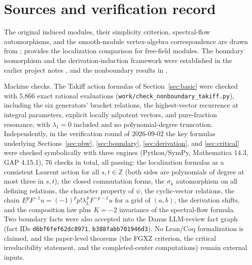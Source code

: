 \documentclass[11pt,a4paper]{article}
\newcommand{\Z}{\mathbb Z}
\theoremstyle{plainupright}
\begin{document}
\section{Sources and verification record}\label{sec:verify}

The original induced modules, their simplicity criterion, spectral-flow
automorphisms, and the smooth-module vertex-algebra correspondence are drawn
from \cite{FGXZ}; \cite{FGM} provides the localization comparison for
free-field modules. The boundary isomorphism and the derivation-induction
framework were established in the earlier project notes \cite{Boundary,
LivingV8}, and the nonboundary results in \cite{Nonboundary}.

Machine checks. The Takiff action formulas of Section~\ref{sec:basic} were
checked with 5,866 exact rational evaluations
(\texttt{work/check\_nonboundary\_takiff.py}), including the six generators'
bracket relations, the highest-vector recurrence at integral parameters,
explicit locally nilpotent vectors, and pure-fraction resonance, with
\(\lambda_1=0\) included and no polynomial-degree truncation. Independently,
in the verification round of 2026-09-02 the key formulas underlying
Sections~\ref{sec:pbw}, \ref{sec:boundary}, \ref{sec:derivation}, and
\ref{sec:critical} were checked symbolically with three engines
(Python/SymPy, Mathematica 14.3, GAP 4.15.1), 76 checks in total, all
passing: the localization formulas as a consistent Laurent action for all
\(s,t\in\Z\) (both sides are polynomials of degree at most three in \(s,t\)),
the closed commutation forms, the \(\sigma_k\) automorphism on all defining
relations, the character property of \(\psi\), the cyclic-vector relations,
the chain \(E^pF^{-1}u=(-1)^pp!\lambda_L^{\,p}F^{-p-1}u\) for a grid of
\((a,b)\), the derivation shifts, and the composition law plus \(K=-2\)
invariance of the spectral-flow formula. Two boundary facts were also
accepted into the Danus LLM-review fact graph (fact IDs
\texttt{d6bf6fef62dc8971}, \texttt{b388fabb701946d3}). No Lean/Coq
formalization is claimed, and the paper-level theorems (the FGXZ criterion,
the critical irreducibility statement, and the completed-center computations)
remain external inputs.
\end{document}
